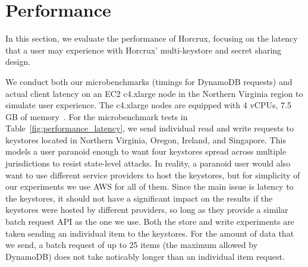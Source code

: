 \section{Performance}\label{sec:performance}


In this section, we evaluate the performance of Horcrux, focusing on the latency that a user may experience with Horcrux' multi-keystore and secret sharing design. 

 We conduct both our microbenchmarks (timings for DynamoDB requests) and actual client latency on an EC2 c4.xlarge node in the Northern Virginia region to simulate user experience. The c4.xlarge nodes are equipped with 4 vCPUs, 7.5 GB of memory~\cite{EC2Bandwidth, EC2Pricing}. For the microbenchmark tests in Table~\ref{fig:performance_latency}, we send individual read and write requests to keystores located in Northern Virginia, Oregon, Ireland, and Singapore. This models a user paranoid enough to want four keystores spread across multiple jurisdictions to resist state-level attacks. In reality, a paranoid user would also want to use different service providers to host the keystores, but for simplicity of our experiments we use AWS for all of them.  Since the main issue is latency to the keystores, it should not have a significant impact on the results if the keystores were hosted by different providers, so long as they provide a similar batch request API as the one we use. Both the store and write experiments are taken sending an individual item to the keystores. For the amount of data that we send, a batch request of up to 25 items (the maximum allowed by DynamoDB) does not take noticably longer than an individual item request. 

